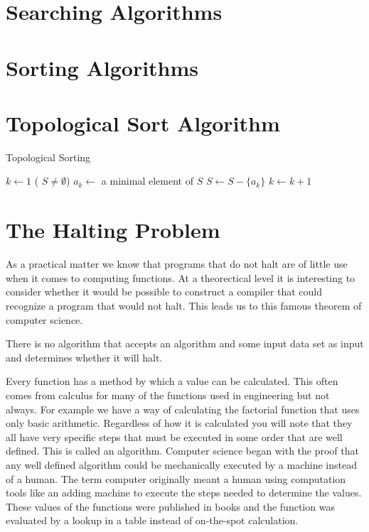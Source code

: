 \section{Searching Algorithms}
\section{Sorting Algorithms}


\section{Topological Sort Algorithm}
\begin{algorithm}
\caption{Topological Sorting}\label{TopologicalSort}
\begin{algorithmic}[1]
\Comment{}
\State $k\gets 1$
\While( $S \neq \emptyset$)
  \State $a_k \gets$ a minimal element of $S$  
  \State $S \gets S - \{a_k\}$
  \State $k \gets k+1$
\EndWhile
{}  
\EndProcedure
\end{algorithmic}
\end{algorithm}



\section{The Halting Problem}
As a practical matter we know that programs that do not halt are of little use when it comes to computing functions. At a theorectical level it is interesting to consider whether it would be possible to construct a compiler that could recognize a program that would not halt. This leads us to this famous theorem of computer science.

\begin{theorem}
There is no algorithm that accepts an algorithm and some input data set as input and determines whether it will halt.
\end{theorem}

Every function has a method by which a value can be calculated. This often comes from calculus for many of the functions used in engineering but not always. For example we have a way of calculating the factorial function that uses only basic arithmetic. Regardless of how it is calculated you will note that they all have very specific steps that must be executed in some order that are well defined. This is called an algorithm. Computer science began with the proof that any well defined algorithm could be mechanically executed by a machine instead of a human. The term computer originally meant a human using computation tools like an adding machine to execute the steps needed to determine the values. These values of the functions were published in books and the function was evaluated by a lookup in a table instead of on-the-spot calculation.

